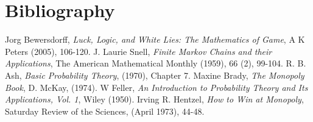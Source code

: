 \documentclass[12pt]{article}
\begin{document}
\section{Bibliography}
\begin{thebibliography}{9}

  Jorg Bewersdorff,
  \emph{Luck, Logic, and White Lies: The Mathematics of Game},
  A K Peters (2005),
  106-120.
  J. Laurie Snell,
  \emph{Finite Markov Chains and their Applications},
  The American Mathematical Monthly (1959),
  66 (2),
  99-104.
  R. B. Ash,
  \emph{Basic Probability Theory},
  (1970),
  Chapter 7.
  Maxine Brady,
  \emph{The Monopoly Book},
  D. McKay, 
  (1974).
  W Feller,
  \emph{An Introduction to Probability Theory and Its Applications, Vol. 1},
  Wiley (1950).
  Irving R. Hentzel,
  \emph{How to Win at Monopoly},
  Saturday Review of the Sciences,
  (April 1973),
  44-48.
\end{thebibliography}
\end{document}
